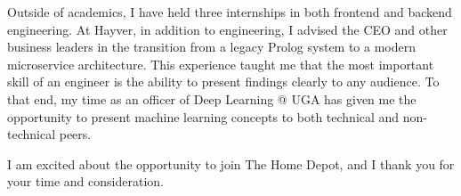\documentclass[11pt, letterpaper]{awesome-cv}
\begin{document}
\begin{cvletter}
Outside of academics, I have held three internships in both frontend and backend engineering. At Hayver, in addition to engineering, I advised the CEO and other business leaders in the transition from a legacy Prolog system to a modern microservice architecture. This experience taught me that the most important skill of an engineer is the ability to present findings clearly to any audience. To that end, my time as an officer of Deep Learning @ UGA has given me the opportunity to present machine learning concepts to both technical and non-technical peers.

I am excited about the opportunity to join The Home Depot, and I thank you for your time and consideration.


\end{cvletter}


\makeletterclosing
\end{document}
